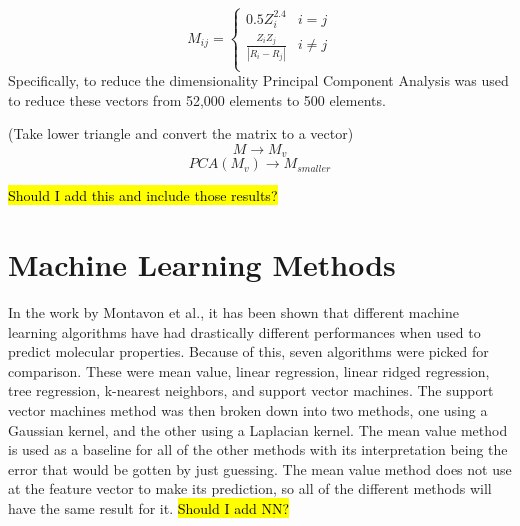 \documentclass[10pt]{article}
\begin{document}
$$
M_{ij} =
\begin{cases}
    0.5 Z_i^{2.4} & i = j \\
    \frac{Z_i Z_j}{|R_i - R_j|} & i \ne j \\
\end{cases}
$$
Specifically, to reduce the dimensionality Principal Component Analysis was used to reduce these vectors from 52,000 elements to 500 elements.


(Take lower triangle and convert the matrix to a vector)
$$M \rightarrow M_v$$
$$PCA(M_v) \rightarrow M_{smaller}$$

\hl{Should I add this and include those results?}

\section{Machine Learning Methods}

In the work by Montavon et al., it has been shown that different machine learning algorithms have had drastically different performances when used to predict molecular properties. Because of this, seven algorithms were picked for comparison. These were mean value, linear regression, linear ridged regression, tree regression, k-nearest neighbors, and support vector machines. The support vector machines method was then broken down into two methods, one using a Gaussian kernel, and the other using a Laplacian kernel. The mean value method is used as a baseline for all of the other methods with its interpretation being the error that would be gotten by just guessing. The mean value method does not use at the feature vector to make its prediction, so all of the different methods will have the same result for it. \hl{Should I add NN?}
\end{document}
